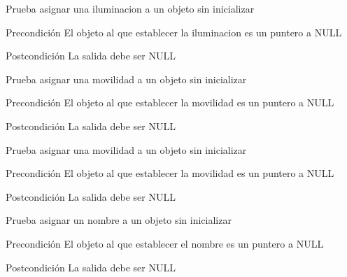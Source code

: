 \begin{DoxyRefList}
\item[\label{test__test000180}%
\hypertarget{test__test000180}{}%
Global \hyperlink{object__test_8c_ad4f16842b4de19b210ce344daa9b1a5d}{test2\-\_\-object\-\_\-set\-\_\-\-Light} ()]Prueba asignar una iluminacion a un objeto sin inicializar \begin{DoxyPrecond}{Precondición}
El objeto al que establecer la iluminacion es un puntero a N\-U\-L\-L 
\end{DoxyPrecond}
\begin{DoxyPostcond}{Postcondición}
La salida debe ser N\-U\-L\-L  
\end{DoxyPostcond}

\item[\label{test__test000170}%
\hypertarget{test__test000170}{}%
Global \hyperlink{object__test_8c_a551ef3572071200971fc75bbd5373d8f}{test2\-\_\-object\-\_\-set\-\_\-\-Mobile} ()]Prueba asignar una movilidad a un objeto sin inicializar \begin{DoxyPrecond}{Precondición}
El objeto al que establecer la movilidad es un puntero a N\-U\-L\-L 
\end{DoxyPrecond}
\begin{DoxyPostcond}{Postcondición}
La salida debe ser N\-U\-L\-L  
\end{DoxyPostcond}

\item[\label{test__test000172}%
\hypertarget{test__test000172}{}%
Global \hyperlink{object__test_8c_a8de46c541146803f15e8a58ad83ab18a}{test2\-\_\-object\-\_\-set\-\_\-\-Moved} ()]Prueba asignar una movilidad a un objeto sin inicializar \begin{DoxyPrecond}{Precondición}
El objeto al que establecer la movilidad es un puntero a N\-U\-L\-L 
\end{DoxyPrecond}
\begin{DoxyPostcond}{Postcondición}
La salida debe ser N\-U\-L\-L  
\end{DoxyPostcond}

\item[\label{test__test000160}%
\hypertarget{test__test000160}{}%
Global \hyperlink{object__test_8c_acf42b7e7be91ede243f2aaa56c4c9347}{test2\-\_\-object\-\_\-set\-\_\-name} ()]Prueba asignar un nombre a un objeto sin inicializar \begin{DoxyPrecond}{Precondición}
El objeto al que establecer el nombre es un puntero a N\-U\-L\-L 
\end{DoxyPrecond}
\begin{DoxyPostcond}{Postcondición}
La salida debe ser N\-U\-L\-L  
\end{DoxyPostcond}


\end{DoxyRefList}
